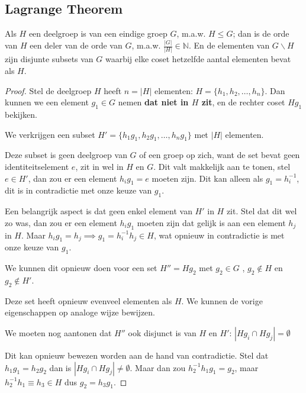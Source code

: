 \subsection{Lagrange Theorem}

\begin{theorem}
    Als \(H\) een deelgroep is van een eindige groep \(G\), m.a.w. \(H \leq G\); dan is de orde van \(H\) een deler van de orde van \(G\), m.a.w. \(\frac{|G|}{|H|} \in \mathbb{N}\).
    En de elementen van \(G\backslash H\) zijn disjunte subsets van \(G\) waarbij elke coset hetzelfde aantal elementen bevat als \(H\).
\end{theorem}
\begin{proof}
    Stel de deelgroep \(H\) heeft \(n = |H|\) elementen: \(H = \{h_1, h_2, \ldots, h_n\}\).
    Dan kunnen we een element \(g_1 \in G\) nemen \textbf{dat niet in \(H\) zit}, en de rechter coset \(Hg_1\) bekijken. 

    We verkrijgen een subset \(H' = \{h_1g_1, h_2g_1, \ldots, h_n g_1 \}\) met \(|H|\) elementen.

    Deze subset is geen deelgroep van \(G\) of een groep op zich, want de set bevat geen identiteitselement \(e\), zit in wel in \(H\) en \(G\). 
    Dit valt makkelijk aan te tonen, stel \(e \in H'\), dan zou er een element \(h_ig_1 = e\) moeten zijn. Dit kan alleen als \(g_1 = h_i^{-1}\), dit is in contradictie met onze keuze van \(g_1\).

    Een belangrijk aspect is dat geen enkel element van \(H'\) in \(H\) zit.
    Stel dat dit wel zo was, dan zou er een element \(h_ig_1\) moeten zijn dat gelijk is aan een element \(h_j\) in \(H\).
    Maar \(h_ig_1 = h_j \implies g_1 = h_i^{-1}h_j \in H\), wat opnieuw in contradictie is met onze keuze van \(g_1\).

    We kunnen dit opnieuw doen voor een set \(H''=Hg_2\) met \(g_2 \in G\) , \(g_2 \notin H\) en \(g_2 \notin H'\).

    Deze set heeft opnieuw evenveel elementen als \(H\).
    We kunnen de vorige eigenschappen op analoge wijze bewijzen.

    We moeten nog aantonen dat \(H''\) ook disjunct is van \(H\) en \(H'\): \(|Hg_i \cap Hg_j| = \emptyset\)

    Dit kan opnieuw bewezen worden aan de hand van contradictie. Stel dat \(h_1g_1 = h_2g_2 \) dan is \(|Hg_i \cap Hg_j| \neq \emptyset\).
    Maar dan zou \(h_2^{-1}h_1g_1 = g_2\), maar \(h_2^{-1}h_1 \equiv h_3 \in H\) dus \(g_2 = h_3g_1 \).


\end{proof}
